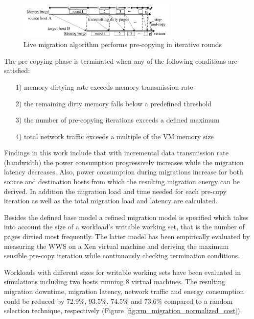 \begin{figure}[htbp]
	\centering
		\includegraphics[width=0.7\textwidth]{figures/state_of_the_art/VM_migration_precopy.PNG}
	\caption{Live migration algorithm performs pre-copying in iterative rounds \cite{liu2013performance}}
	\label{fig:VM_migration_precopy}
\end{figure}

The pre-copying phase is terminated when any of the following conditions are satisfied:

\begin{enumerate}
	\item [1)] memory dirtying rate exceeds memory transmission rate
	\item [2)] the remaining dirty memory falls below a predefined threshold
	\item [3)] the number of pre-copying iterations exceeds a defined maximum
	\item [4)] total network traffic exceeds a multiple of the VM memory size
\end{enumerate}

Findings in this work include that with incremental data transmission rate (bandwidth) the power consumption progressively increases while the migration latency decreases. Also, power consumption during migrations increase for both source and destination hosts from which the resulting migration energy can be derived. In addition the migration load and time needed for each pre-copy iteration as well as the total migration load and latency are calculated. 

Besides the defined base model a refined migration model is specified which takes into account the size of a workload's writable working set, that is the number of pages dirtied most frequently. The latter model has been empirically evaluated by measuring the WWS on a Xen virtual machine and deriving the maximum sensible pre-copy iteration while continuously checking termination conditions. 

Workloads with different sizes for writable working sets have been evaluated in simulations including two hosts running 8 virtual machines. 
The resulting migration downtime, migration latency, network traffic and energy consumption could be reduced by 72.9\%, 93.5\%, 74.5\% and 73.6\% compared to a random selection technique, respectively (Figure \ref{fig:vm_migration_normalized_cost}). 

